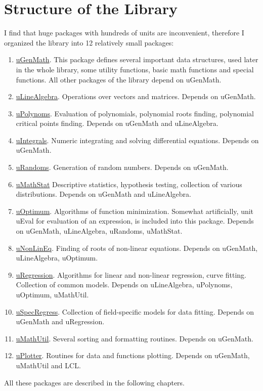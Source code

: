 \documentclass[12pt,a4paper,oneside]{report}
\begin{document}
\chapter{Structure of the Library}
I find that huge packages with hundreds of units are inconvenient, therefore I organized the library into 12 relatively small packages:
\begin{enumerate}
	\item{\hyperref[package-ugenmath]{uGenMath}.} This package defines several important data structures, used later in the whole library, some utility functions, basic math functions and special functions. All other packages of the library depend on uGenMath.
	\item{\hyperref[package-ulinealgebra]{uLineAlgebra}.} Operations over vectors and matrices. Depends on uGenMath.
	\item{\hyperref[package-upolynoms]{uPolynoms}.} Evaluation of polynomials, polynomial roots finding, polynomial critical points finding. Depends on uGenMath and uLineAlgebra.
	\item{\hyperref[package-uintegrals]{uIntegrals}.} Numeric integrating and solving differential equations. Depends on uGenMath.
	\item{\hyperref[package-urandoms]{uRandoms}.} Generation of random numbers. Depends on uGenMath.
	\item{\hyperref[package]{uMathStat}} Descriptive statistics, hypothesis testing, collection of various distributions. Depends on uGenMath and uLineAlgebra.
	\item{\hyperref[package-uoptimum]{uOptimum}.} Algorithms of function minimization. Somewhat artificially, unit uEval for evaluation of an expression, is included into this package. Depends on uGenMath, uLineAlgebra, uRandoms, uMathStat.
	\item{\hyperref[package-unonlineq]{uNonLinEq}.} Finding of roots of non-linear equations. Depends on uGenMath, uLineAlgebra, uOptimum.
	\item{\hyperref[package-uregression]{uRegression}.} Algorithms for linear and non-linear regression, curve fitting. Collection of common models. Depends on uLineAlgebra, uPolynoms, uOptimum, uMathUtil.
	\item{\hyperref[package-uspecregress]{uSpecRegress}.} Collection of field-specific models for data fitting. Depends on uGenMath and uRegression.
	\item{\hyperref[package-umathutil]{uMathUtil}.} Several sorting and formatting routines. Depends on uGenMath.
	\item{\hyperref[package-uplotter]{uPlotter}.} Routines for data and functions plotting. Depends on uGenMath, uMathUtil and LCL.
\end{enumerate}	
All these packages are described in the following chapters. 
\end{document}
